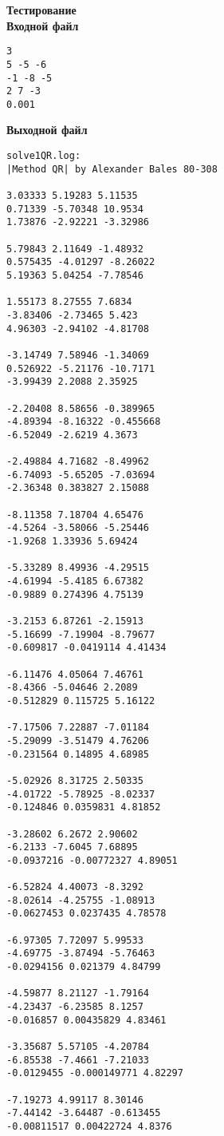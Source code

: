 \textbf{Тестирование}\\

\textbf{Входной файл}
\begin{verbatim}
3
5 -5 -6
-1 -8 -5
2 7 -3
0.001
\end{verbatim}

\textbf{Выходной файл}
\begin{verbatim}
solve1QR.log:
|Method QR| by Alexander Bales 80-308

3.03333 5.19283 5.11535 
0.71339 -5.70348 10.9534 
1.73876 -2.92221 -3.32986 

5.79843 2.11649 -1.48932 
0.575435 -4.01297 -8.26022 
5.19363 5.04254 -7.78546 

1.55173 8.27555 7.6834 
-3.83406 -2.73465 5.423 
4.96303 -2.94102 -4.81708 

-3.14749 7.58946 -1.34069 
0.526922 -5.21176 -10.7171 
-3.99439 2.2088 2.35925 

-2.20408 8.58656 -0.389965 
-4.89394 -8.16322 -0.455668 
-6.52049 -2.6219 4.3673 

-2.49884 4.71682 -8.49962 
-6.74093 -5.65205 -7.03694 
-2.36348 0.383827 2.15088 

-8.11358 7.18704 4.65476 
-4.5264 -3.58066 -5.25446 
-1.9268 1.33936 5.69424 

-5.33289 8.49936 -4.29515 
-4.61994 -5.4185 6.67382 
-0.9889 0.274396 4.75139 

-3.2153 6.87261 -2.15913 
-5.16699 -7.19904 -8.79677 
-0.609817 -0.0419114 4.41434 

-6.11476 4.05064 7.46761 
-8.4366 -5.04646 2.2089 
-0.512829 0.115725 5.16122 

-7.17506 7.22887 -7.01184 
-5.29099 -3.51479 4.76206 
-0.231564 0.14895 4.68985 

-5.02926 8.31725 2.50335 
-4.01722 -5.78925 -8.02337 
-0.124846 0.0359831 4.81852 

-3.28602 6.2672 2.90602 
-6.2133 -7.6045 7.68895 
-0.0937216 -0.00772327 4.89051 

-6.52824 4.40073 -8.3292 
-8.02614 -4.25755 -1.08913 
-0.0627453 0.0237435 4.78578 

-6.97305 7.72097 5.99533 
-4.69775 -3.87494 -5.76463 
-0.0294156 0.021379 4.84799 

-4.59877 8.21127 -1.79164 
-4.23437 -6.23585 8.1257 
-0.016857 0.00435829 4.83461 

-3.35687 5.57105 -4.20784 
-6.85538 -7.4661 -7.21033 
-0.0129455 -0.000149771 4.82297 

-7.19273 4.99117 8.30146 
-7.44142 -3.64487 -0.613455 
-0.00811517 0.00422724 4.8376 


\end{verbatim}
